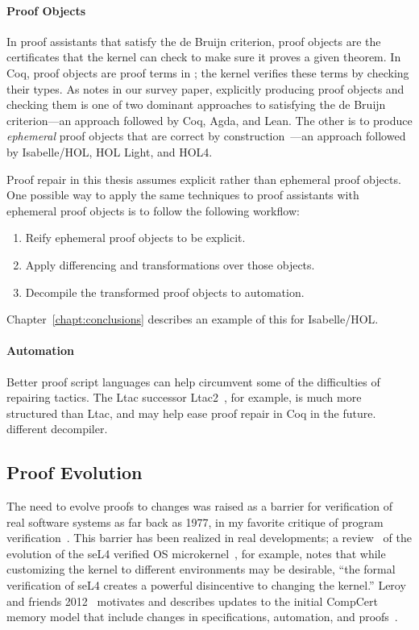 \paragraph{Proof Objects} 
In proof assistants that satisfy the de Bruijn criterion, proof objects are the certificates that the kernel can check to make sure it proves a given theorem.
In Coq, proof objects are proof terms in ; the kernel verifies these terms by checking their types.
As  notes in our survey paper, explicitly producing proof objects and checking them is one of two dominant approaches to satisfying 
the de Bruijn criterion---an approach followed by Coq, Agda, and Lean.
The other is to produce \textit{ephemeral} proof objects that are correct by construction~\cite{Barendregt2013}---an approach followed
by Isabelle/HOL, HOL Light, and HOL4. %

Proof repair in this thesis assumes explicit rather than ephemeral proof objects.
One possible way to apply the same techniques to proof assistants with ephemeral proof objects is to follow the following workflow:

\begin{enumerate}
\item Reify ephemeral proof objects to be explicit.
\item Apply differencing and transformations over those objects.
\item Decompile the transformed proof objects to automation.
\end{enumerate}
Chapter~\ref{chapt:conclusions} describes an example of this for Isabelle/HOL.

\paragraph{Automation} %
Better proof script languages can help circumvent some of the difficulties of repairing tactics.
The Ltac successor Ltac2~\cite{ltac2}, for example, is much more structured than Ltac, and may help ease proof repair in Coq in the future.
different decompiler.

\subsection{Proof Evolution}
\label{sec:refrep}


The need to evolve proofs to changes was raised as a barrier for verification of real software systems as far back as 1977, in my favorite critique of program verification~\cite{DeMillo1977}.
This barrier has been realized in real developments; a review~\cite{Elphinstone2013} of the evolution of the seL4 verified 
OS microkernel~\cite{Klein2009}, for example, notes that while
customizing the kernel to different environments may be desirable, 
``the formal verification of seL4 creates a powerful disincentive to changing the kernel.''
Leroy and friends 2012~\cite{leroy2012} motivates and describes updates to the initial CompCert memory model
that include changes in specifications, automation, and proofs~\cite{leroy-mem-2010}.

